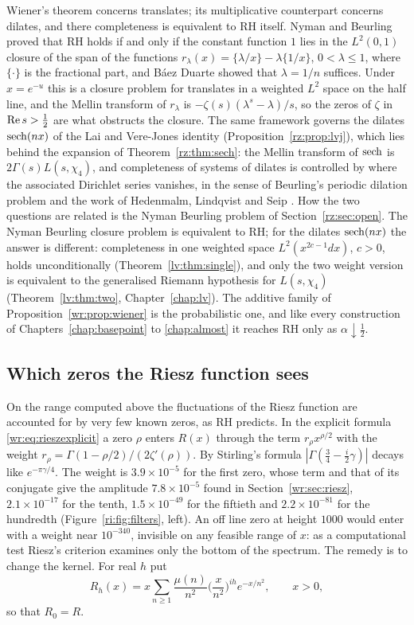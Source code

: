 Wiener's theorem concerns translates; its multiplicative counterpart concerns dilates, and there completeness is equivalent to RH itself. Nyman and Beurling \cite{Nyman50,Beurling55} proved that RH holds if and only if the constant function $1$ lies in the $L^2(0,1)$ closure of the span of the functions $r_\lambda(x)=\{\lambda/x\}-\lambda\{1/x\}$, $0<\lambda\le1$, where $\{\cdot\}$ is the fractional part, and B\'aez Duarte \cite{BaezDuarte03} showed that $\lambda=1/n$ suffices. Under $x=e^{-u}$ this is a closure problem for translates in a weighted $L^2$ space on the half line, and the Mellin transform of $r_\lambda$ is $-\zeta(s)(\lambda^s-\lambda)/s$, so the zeros of $\zeta$ in $\operatorname{Re} s>\frac12$ are what obstructs the closure. The same framework governs the dilates $\operatorname{sech}(nx)$ of the Lai and Vere-Jones identity (Proposition~\ref{rz:prop:lvj}), which lies behind the expansion of Theorem~\ref{rz:thm:sech}: the Mellin transform of $\operatorname{sech}$ is $2\Gamma(s)L(s,\chi_4)$, and completeness of systems of dilates is controlled by where the associated Dirichlet series vanishes, in the sense of Beurling's periodic dilation problem and the work of Hedenmalm, Lindqvist and Seip \cite{HLS97}. How the two questions are related is the Nyman Beurling problem of Section~\ref{rz:sec:open}. The Nyman Beurling closure problem is equivalent to RH; for the dilates $\operatorname{sech}(nx)$ the answer is different: completeness in one weighted space $L^2(x^{2c-1}dx)$, $c>0$, holds unconditionally (Theorem~\ref{lv:thm:single}), and only the two weight version is equivalent to the generalised Riemann hypothesis for $L(s,\chi_4)$ (Theorem~\ref{lv:thm:two}, Chapter~\ref{chap:lv}). The additive family of Proposition~\ref{wr:prop:wiener} is the probabilistic one, and like every construction of Chapters~\ref{chap:basepoint} to \ref{chap:almost} it reaches RH only as $\alpha\downarrow\frac12$.

\subsection{Which zeros the Riesz function sees}\label{ri:sec:filters}

On the range computed above the fluctuations of the Riesz function are accounted for by very few known zeros, as RH predicts. In the explicit formula \eqref{wr:eq:rieszexplicit} a zero $\rho$ enters $R(x)$ through the term $r_\rho x^{\rho/2}$ with the weight $r_\rho=\Gamma(1-\rho/2)/(2\zeta'(\rho))$. By Stirling's formula $|\Gamma(\frac34-\frac i2\gamma)|$ decays like $e^{-\pi\gamma/4}$. The weight is $3.9\times10^{-5}$ for the first zero, whose term and that of its conjugate give the amplitude $7.8\times10^{-5}$ found in Section~\ref{wr:sec:riesz}, $2.1\times10^{-17}$ for the tenth, $1.5\times10^{-49}$ for the fiftieth and $2.2\times10^{-81}$ for the hundredth (Figure~\ref{ri:fig:filters}, left). An off line zero at height $1000$ would enter with a weight near $10^{-340}$, invisible on any feasible range of $x$: as a computational test Riesz's criterion examines only the bottom of the spectrum. The remedy is to change the kernel. For real $h$ put
\[
R_h(x)=x\sum_{n\ge1}\frac{\mu(n)}{n^2}\Big(\frac x{n^2}\Big)^{ih}e^{-x/n^2},\qquad x>0,
\]
so that $R_0=R$.

